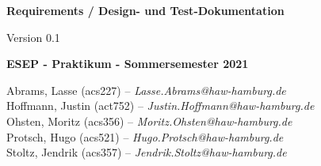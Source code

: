 \begin{titlepage}
    \begin{center}
        \begin{huge}
            \textbf{Requirements / Design- und Test-Dokumentation}
        \end{huge}

        \begin{large}
            \vspace{0.5cm}
            Version 0.1

            \vspace{0.5cm}

            \textbf{ESEP - Praktikum - Sommersemester 2021}
        \end{large}

        \vspace{0.5cm}

        \vfill

        Abrams, Lasse (acs227) -- \textit{Lasse.Abrams@haw-hamburg.de}\\
        Hoffmann, Justin (act752) -- \textit{Justin.Hoffmann@haw-hamburg.de}\\
        Ohsten, Moritz (acs356) -- \textit{Moritz.Ohsten@haw-hamburg.de}\\
        Protsch, Hugo (acs521) -- \textit{Hugo.Protsch@haw-hamburg.de}\\
        Stoltz, Jendrik (acs357) -- \textit{Jendrik.Stoltz@haw-hamburg.de}\\
    \end{center}
\end{titlepage}